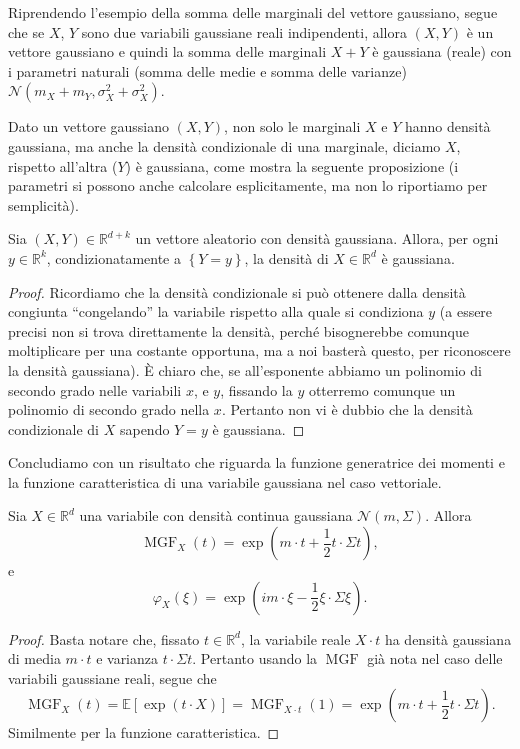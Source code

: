 \documentclass[
  italian,
  letterpaper,
]{book}
\newcommand{\bra}[1]{\left( #1 \right)}
\newcommand{\sqa}[1]{\left[ #1 \right]}
\newcommand{\cur}[1]{\left\{ #1 \right\}}
\newcommand{\R}{\mathbb{R}}
\newcommand{\E}[1]{\mathbb{E}\sqa{#1}}
\theoremstyle{definition}
\theoremstyle{remark}
\begin{document}
Riprendendo l'esempio della somma delle marginali del vettore gaussiano,
segue che se \(X\), \(Y\) sono due variabili gaussiane reali
indipendenti, allora \((X, Y)\) è un vettore gaussiano e quindi la somma
delle marginali \(X+Y\) è gaussiana (reale) con i parametri naturali
(somma delle medie e somma delle varianze)
\(\mathcal{N}(m_X+m_Y, \sigma_{X}^2 + \sigma_{X}^2)\).

Dato un vettore gaussiano \((X,Y)\), non solo le marginali \(X\) e \(Y\)
hanno densità gaussiana, ma anche la densità condizionale di una
marginale, diciamo \(X\), rispetto all'altra (\(Y\)) è gaussiana, come
mostra la seguente proposizione (i parametri si possono anche calcolare
esplicitamente, ma non lo riportiamo per semplicità).

Sia \((X,Y) \in \R^{d+k}\) un vettore aleatorio con densità gaussiana.
Allora, per ogni \(y \in \R^k\), condizionatamente a \(\cur{Y=y}\), la
densità di \(X \in\R^d\) è gaussiana.

\begin{proof}
Ricordiamo che la densità condizionale si può ottenere dalla densità
congiunta ``congelando'' la variabile rispetto alla quale si condiziona
\(y\) (a essere precisi non si trova direttamente la densità, perché
bisognerebbe comunque moltiplicare per una costante opportuna, ma a noi
basterà questo, per riconoscere la densità gaussiana). È chiaro che, se
all'esponente abbiamo un polinomio di secondo grado nelle variabili
\(x\), e \(y\), fissando la \(y\) otterremo comunque un polinomio di
secondo grado nella \(x\). Pertanto non vi è dubbio che la densità
condizionale di \(X\) sapendo \(Y=y\) è gaussiana.
\end{proof}

Concludiamo con un risultato che riguarda la funzione generatrice dei
momenti e la funzione caratteristica di una variabile gaussiana nel caso
vettoriale.

Sia \(X \in \R^d\) una variabile con densità continua gaussiana
\(\mathcal{N}(m, \Sigma)\). Allora
\[ \operatorname{MGF}_X(t) = \exp\bra{ m\cdot t + \frac{1}{2} t \cdot \Sigma t},\]
e
\[ \varphi_X(\xi) = \exp\bra{ im\cdot\xi - \frac{1}{2} \xi \cdot \Sigma \xi}.\]

\begin{proof}
Basta notare che, fissato \(t \in \R^d\), la variabile reale
\(X\cdot t\) ha densità gaussiana di media \(m \cdot t\) e varianza
\(t \cdot \Sigma t\). Pertanto usando la \(\operatorname{MGF}\) già nota
nel caso delle variabili gaussiane reali, segue che
\[ \operatorname{MGF}_X(t) = \E{\exp\bra{ t \cdot X}}=\operatorname{MGF}_{X \cdot t} (1) = \exp\bra{ m\cdot t + \frac{1}{2} t \cdot \Sigma t}.\]
Similmente per la funzione caratteristica.
\end{proof}
\end{document}
